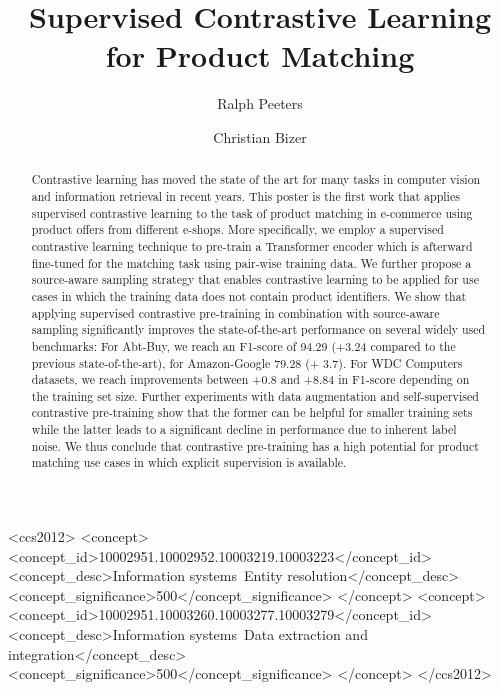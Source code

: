 \documentclass[sigconf]{acmart}
\begin{document}
\title{Supervised Contrastive Learning for Product Matching}

\author{Ralph Peeters}

\author{Christian Bizer}

\renewcommand{\shortauthors}{Peeters and Bizer}

\begin{abstract}
  Contrastive learning has moved the state of the art for many tasks in computer vision and information retrieval in recent years. This poster is the first work that applies supervised contrastive learning to the task of product matching in e-commerce using product offers from different e-shops. More specifically, we employ a supervised contrastive learning technique to pre-train a Transformer encoder which is afterward fine-tuned for the matching task using pair-wise training data. We further propose a source-aware sampling strategy that enables contrastive learning to be applied for use cases in which the training data does not contain product identifiers. We show that applying supervised contrastive pre-training in combination with source-aware sampling significantly improves the state-of-the-art performance on several widely used benchmarks: For Abt-Buy, we reach an F1-score of 94.29 (+3.24 compared to the previous state-of-the-art), for Amazon-Google 79.28 (+ 3.7). For WDC Computers datasets, we reach improvements between +0.8 and +8.84 in F1-score depending on the training set size. Further experiments with data augmentation and self-supervised contrastive pre-training show that the former can be helpful for smaller training sets while the latter leads to a significant decline in performance due to inherent label noise. We thus conclude that contrastive pre-training has a high potential for product matching use cases in which explicit supervision is available.
\end{abstract}

\begin{CCSXML}
<ccs2012>
   <concept>
       <concept_id>10002951.10002952.10003219.10003223</concept_id>
       <concept_desc>Information systems~Entity resolution</concept_desc>
       <concept_significance>500</concept_significance>
       </concept>
   <concept>
       <concept_id>10002951.10003260.10003277.10003279</concept_id>
       <concept_desc>Information systems~Data extraction and integration</concept_desc>
       <concept_significance>500</concept_significance>
       </concept>
 </ccs2012>
\end{CCSXML}
\end{document}
